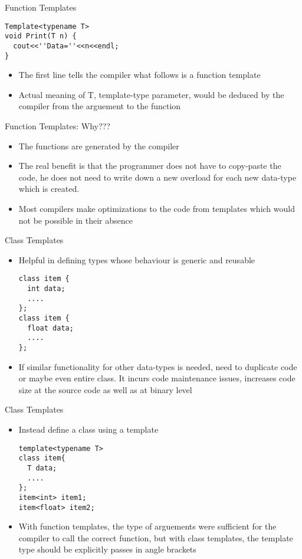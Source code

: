 \documentclass{beamer}
\begin{document}
\begin{frame}[fragile]{Function Templates}
  \begin{lstlisting}
Template<typename T>
void Print(T n) {
  cout<<''Data=''<<n<<endl;
}
  \end{lstlisting}\pause
  \begin{itemize}
    \item The first line tells the compiler what follows is a function template\pause
    \item Actual meaning of T, template-type parameter, would be deduced by the compiler from the arguement to the function
  \end{itemize}
\end{frame}

\begin{frame}[fragile]{Function Templates: Why???}
  \begin{itemize}
  \item The functions are generated by the compiler\pause
  \item The real benefit is that the programmer does not have to copy-paste the code, he does not need to write down a new overload for each new data-type which is created.\pause
  \item Most compilers make optimizations to the code from templates which would not be possible in their absence
  \end{itemize}
\end{frame}

\begin{frame}[fragile]{Class Templates}
  \begin{itemize}
  \item Helpful in defining types whose behaviour is generic and reusable\pause
    \begin{lstlisting}
class item {
  int data;
  ....
};
class item {
  float data;
  ....
};
    \end{lstlisting}\pause
  \item If similar functionality for other data-types is needed, need to duplicate code or maybe even entire class. It incurs code maintenance issues, increases code size at the source code as well as at binary level
  \end{itemize}
\end{frame}

\begin{frame}[fragile]{Class Templates}
  \begin{itemize}
  \item Instead define a class using a template\pause
    \begin{lstlisting}
template<typename T>
class item{
  T data;
  ....
};
item<int> item1;
item<float> item2;
    \end{lstlisting}\pause
  \item With function templates, the type of arguements were sufficient for the compiler to call the correct function, but with class templates, the template type should be explicitly passes in angle brackets
  \end{itemize}
\end{frame}
\end{document}

